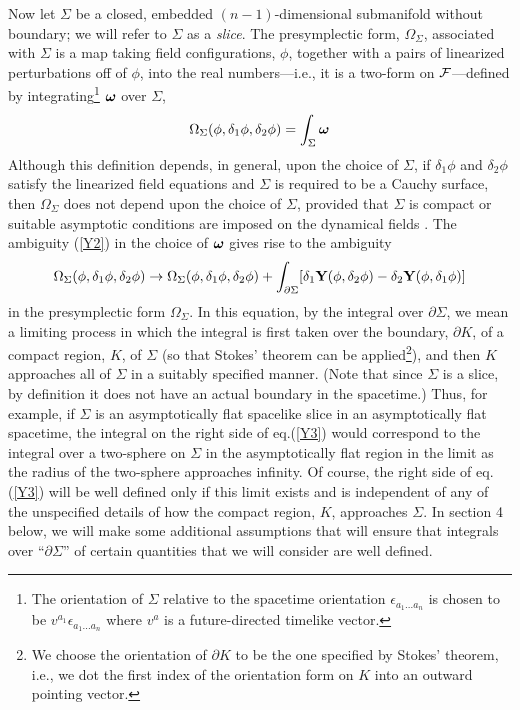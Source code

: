 Now let $\Sigma$ be a closed, embedded $(n-1)$-dimensional submanifold
without boundary; we will refer to $\Sigma$ as a {\it slice}.  The
presymplectic form, $\Omega_\Sigma$, associated with $\Sigma$ is a map
taking field configurations, $\phi$, together with a pairs of
linearized perturbations off of $\phi$, into the real numbers---i.e.,
it is a two-form on ${\cal F}$---defined by integrating\footnote{The
orientation of $\Sigma$ relative to the spacetime orientation
$\epsilon_{a_1...a_n}$ is chosen to be $v^{a_1} \epsilon_{a_1...a_n}$
where $v^a$ is a future-directed timelike vector.\label{orient1}}
${\mbox{\boldmath $\omega$}}$ over $\Sigma$,
\begin{equation}
\Omega_\Sigma (\phi, \delta_1 \phi, \delta_2 \phi) = \int_\Sigma
{\mbox{\boldmath $\omega$}}
\label{Omega}
\end{equation}
Although this definition depends, in general, upon the choice of
$\Sigma$, if $\delta_1 \phi$ and $\delta_2 \phi$ satisfy the
linearized field equations and $\Sigma$ is required to be a Cauchy
surface, then $\Omega_\Sigma$ does not depend upon the choice of $\Sigma$,
provided that $\Sigma$ is compact or suitable asymptotic conditions
are imposed on the dynamical fields \cite{lw}.  The ambiguity
(\ref{Y2}) in the choice of ${\mbox{\boldmath $\omega$}}$ gives rise
to the ambiguity
\begin{equation}
\Omega_\Sigma (\phi, \delta_1 \phi, \delta_2 \phi) \rightarrow \Omega_\Sigma (\phi,
\delta_1 \phi, \delta_2 \phi) + \int_{\partial \Sigma} [\delta_1 {\bf
Y}(\phi, \delta_2 \phi) - \delta_2 {\bf Y}(\phi, \delta_1 \phi)]
\label{Y3}
\end{equation}
in the presymplectic form $\Omega_\Sigma$. In this equation, by the
integral over $\partial \Sigma$, we mean a limiting process in which
the integral is first taken over the boundary, $\partial K$, of a
compact region, $K$, of $\Sigma$ (so that Stokes' theorem can be
applied\footnote{We choose the orientation of $\partial K$ to be the
one specified by Stokes' theorem, i.e., we dot the first index of the
orientation form on $K$ into an outward pointing
vector.\label{orient2}}), and then $K$ approaches all of $\Sigma$ in a
suitably specified manner. (Note that since $\Sigma$ is a slice, by
definition it does not have an actual boundary in the spacetime.)
Thus, for example, if $\Sigma$ is an asymptotically flat spacelike
slice in an asymptotically flat spacetime, the integral on the right
side of eq.(\ref{Y3}) would correspond to the integral over a
two-sphere on $\Sigma$ in the asymptotically flat region in the limit
as the radius of the two-sphere approaches infinity. Of course, the
right side of eq.(\ref{Y3}) will be well defined only if this limit
exists and is independent of any of the unspecified details of how the
compact region, $K$, approaches $\Sigma$. In section 4 below, we will
make some additional assumptions that will ensure that integrals over
``$\partial \Sigma$'' of certain quantities that we will consider are
well defined.

